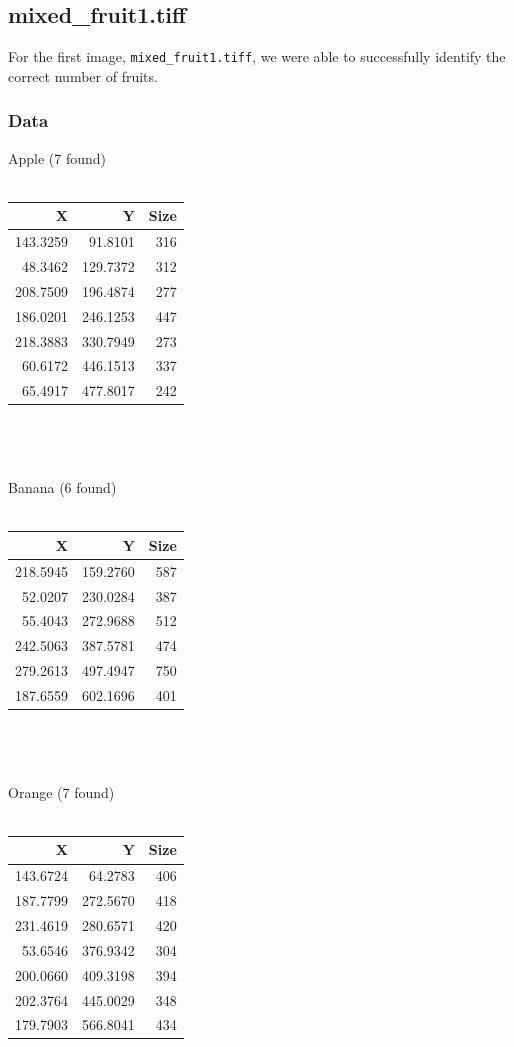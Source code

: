 \documentclass{article}
\begin{document}
\subsection{mixed\_fruit1.tiff}
For the first image, \texttt{mixed\_fruit1.tiff}, we were able to successfully identify the correct number of fruits.
\subsubsection{Data}
Apple (7 found)\\~\\
\begin{tabular}{ | r | r | r | }
\hline
\textbf{X} & \textbf{Y} & \textbf{Size}\\
\hline
143.3259 & 91.8101 & 316\\
\hline
48.3462 & 129.7372 & 312\\
\hline
208.7509 & 196.4874 & 277\\
\hline
186.0201 & 246.1253 & 447\\
\hline
218.3883 & 330.7949 & 273\\
\hline
60.6172 & 446.1513 & 337\\
\hline
65.4917 & 477.8017 & 242\\
\hline
\end{tabular}
~\\~\\~\\
Banana (6 found)\\~\\
\begin{tabular}{ | r | r | r | }
\hline
\textbf{X} & \textbf{Y} & \textbf{Size}\\
\hline
218.5945 & 159.2760 & 587\\
\hline
52.0207 & 230.0284 & 387\\
\hline
55.4043 & 272.9688 & 512\\
\hline
242.5063 & 387.5781 & 474\\
\hline
279.2613 & 497.4947 & 750\\
\hline
187.6559 & 602.1696 & 401\\
\hline
\end{tabular}
~\\~\\~\\
Orange (7 found)\\~\\
\begin{tabular}{ | r | r | r | }
\hline
\textbf{X} & \textbf{Y} & \textbf{Size}\\
\hline
143.6724 & 64.2783 & 406\\
\hline
187.7799 & 272.5670 & 418\\
\hline
231.4619 & 280.6571 & 420\\
\hline
53.6546 & 376.9342 & 304\\
\hline
200.0660 & 409.3198 & 394\\
\hline
202.3764 & 445.0029 & 348\\
\hline
179.7903 & 566.8041 & 434\\
\hline
\end{tabular}
\end{document}
